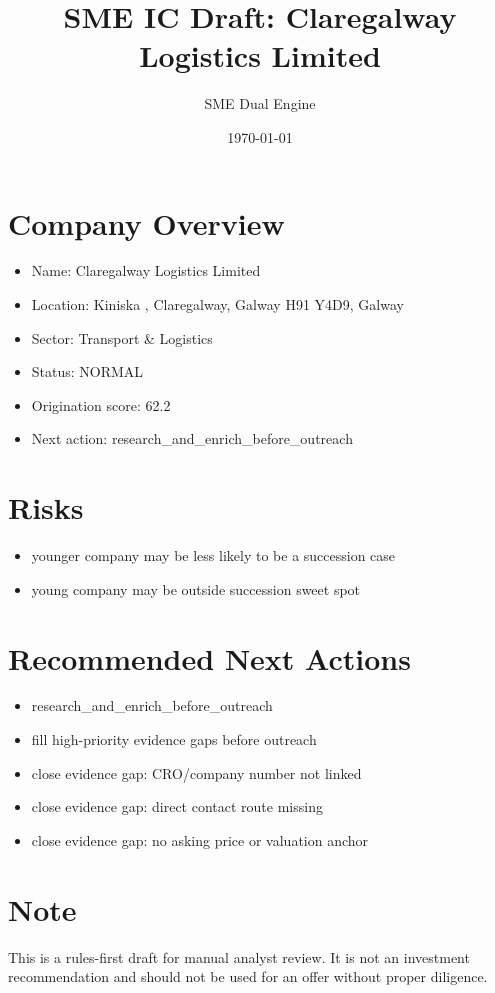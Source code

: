 \documentclass[11pt,a4paper]{article}
\title{SME IC Draft: Claregalway Logistics Limited}
\author{SME Dual Engine}
\date{\today}
\begin{document}
\maketitle
\section*{Company Overview}
\begin{itemize}[leftmargin=1.4em]
\item Name: Claregalway Logistics Limited
\item Location: Kiniska , Claregalway, Galway H91 Y4D9, Galway
\item Sector: Transport \& Logistics
\item Status: NORMAL
\item Origination score: 62.2
\item Next action: research\_and\_enrich\_before\_outreach
\end{itemize}
\section*{Risks}
\begin{itemize}[leftmargin=1.4em]
\item younger company may be less likely to be a succession case
\item young company may be outside succession sweet spot
\end{itemize}
\section*{Recommended Next Actions}
\begin{itemize}[leftmargin=1.4em]
\item research\_and\_enrich\_before\_outreach
\item fill high-priority evidence gaps before outreach
\item close evidence gap: CRO/company number not linked
\item close evidence gap: direct contact route missing
\item close evidence gap: no asking price or valuation anchor
\end{itemize}
\section*{Note}
This is a rules-first draft for manual analyst review. It is not an investment
recommendation and should not be used for an offer without proper diligence.
\end{document}
